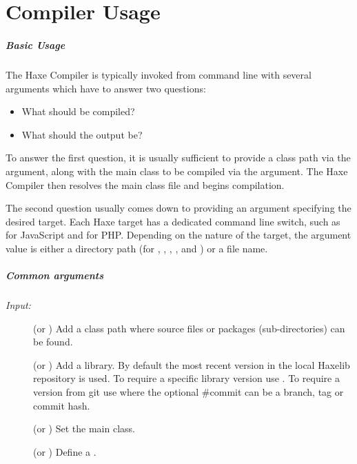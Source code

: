 \chapter{Compiler Usage}
\label{compiler-usage}

\paragraph{Basic Usage}

The Haxe Compiler is typically invoked from command line with several arguments which have to answer two questions:

\begin{itemize}
	\item What should be compiled?
	\item What should the output be?
\end{itemize}
	
To answer the first question, it is usually sufficient to provide a class path via the  argument, along with the main class to be compiled via the  argument. The Haxe Compiler then resolves the main class file and begins compilation.

The second question usually comes down to providing an argument specifying the desired target. Each Haxe target has a dedicated command line switch, such as  for JavaScript and  for PHP. Depending on the nature of the target, the argument value is either a directory path (for , , , , and ) or a file name.

\paragraph{Common arguments}

\emph{Input:}

\begin{description}
	\item[] (or ) Add a class path where  source files or packages (sub-directories) can be found.
	\item[] (or ) Add a  library. By default the most recent version in the local Haxelib repository is used. To require a specific library version use . To require a version from git use  where the optional \#commit can be a branch, tag or commit hash.
	\item[] (or ) Set the main class.
	\item[] (or ) Define a .
\end{description}

